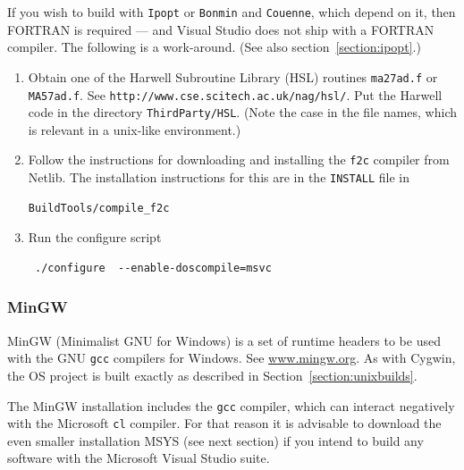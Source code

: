 \documentclass[11pt]{article}
\renewcommand{\_}{{\char"5F}}
\renewcommand{\{}{{\char"7B}}
\renewcommand{\}}{{\char"7D}}
\renewcommand{\^}{{\char"0D}}
\renewcommand{\'}{{\char"0D}}
\newcommand{\UrlHsl}{http://www.cse.scitech.ac.uk/nag/hsl/}
\begin{document}
\begin{enumerate}[Step 1:]
If you wish to build with {\tt Ipopt} or {\tt Bonmin} and {\tt Couenne}, which depend on it, 
then FORTRAN is required --- and Visual Studio does not ship with a FORTRAN compiler.
The following is a work-around. (See also section~\ref{section:ipopt}.)

\begin{enumerate}[Step a.]

\item{}  Obtain one of the   Harwell Subroutine Library (HSL) routines
{\tt ma27ad.f} or {\tt MA57ad.f}. See {\tt\UrlHsl}.  Put the Harwell code in the
directory {\tt ThirdParty/HSL}. (Note the case in the file names, which is relevant in a unix-like environment.)




\item{}  Follow the instructions for downloading and installing the {\tt f2c} compiler from Netlib.
The installation instructions for this are in the {\tt INSTALL} file in
\begin{verbatim}
BuildTools/compile_f2c
\end{verbatim}



\item{}  Run the configure script

\begin{verbatim}
 ./configure  --enable-doscompile=msvc
\end{verbatim}


\end{enumerate}


\end{enumerate}



\subsubsection{MinGW} \label{section:mingw}


MinGW (Minimalist GNU for Windows) is a set of runtime headers to be used with the GNU {\tt gcc} compilers for Windows.
See \url{www.mingw.org}. As with Cygwin, the OS project is  built exactly as described in Section~\ref{section:unixbuilds}.

The MinGW installation includes the {\tt gcc} compiler, which can interact negatively with the Microsoft {\tt cl} compiler.
For that reason it is advisable to download the even smaller installation MSYS (see next section) if you intend to
build any software with the Microsoft Visual Studio suite.
\end{document}
